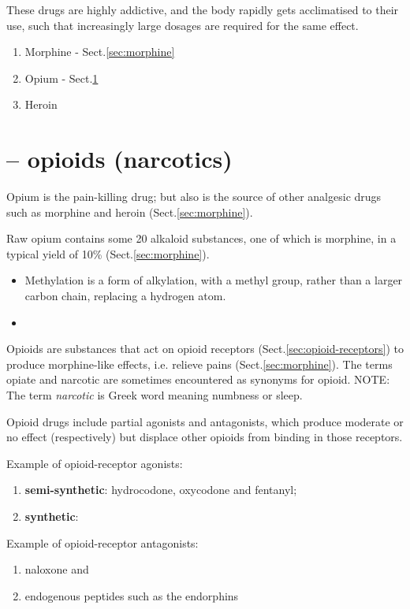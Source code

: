 These drugs are highly addictive, and the body rapidly gets acclimatised to
their use, such that increasingly large dosages are required for the same effect.
\begin{enumerate}
  \item Morphine - Sect.\ref{sec:morphine}
  
  \item Opium - Sect.\ref{sec:opioids}
  
  \item Heroin
\end{enumerate}
\section{-- opioids (narcotics)}
\label{sec:opioids}
\label{sec:narcotics}

Opium is the pain-killing drug; but also is the source of other analgesic drugs
such as morphine and heroin (Sect.\ref{sec:morphine}).


Raw opium contains some 20 alkaloid substances, one of which is morphine, in
a typical yield of 10\% (Sect.\ref{sec:morphine}). 
\begin{itemize}
  \item  Methylation is a form of alkylation, with a methyl group, rather than a
  larger carbon chain, replacing a hydrogen atom.
  
  \item 
\end{itemize}

Opioids are substances that act on opioid receptors
(Sect.\ref{sec:opioid-receptors}) to produce morphine-like effects, i.e.
relieve pains (Sect.\ref{sec:morphine}).
The terms opiate and narcotic are sometimes encountered as synonyms for opioid. 
NOTE: The term {\it narcotic} is Greek word meaning
numbness or sleep.


Opioid drugs include partial agonists and antagonists, which produce moderate or
no effect (respectively) but displace other opioids from binding in those receptors.

Example of opioid-receptor agonists:
\begin{enumerate}
  \item {\bf semi-synthetic}:
   hydrocodone, oxycodone and fentanyl; 
  
  \item {\bf synthetic}: 
\end{enumerate}

Example of opioid-receptor antagonists:
\begin{enumerate}
  \item naloxone and 
  
  \item endogenous peptides such as the endorphins
\end{enumerate}

